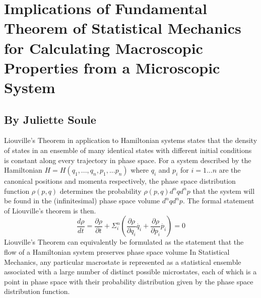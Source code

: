 

\section{Implications of Fundamental Theorem of Statistical Mechanics for Calculating Macroscopic Properties from a Microscopic System}
\subsection*{By Juliette Soule}
Liouville's Theorem in application to Hamiltonian systems states that the density of states in an ensemble of many identical states with different initial conditions is constant along every trajectory in phase space. For a system described by the Hamiltonian $H = H(q_{1},...,q_{n},p_{1},...p_{n})$ where $q_{i}$ and $p_{i}$ for $i=1...n$ are the canonical positions and momenta respectively, the phase space distribution function $\rho(p,q)$ determines the probability $\rho(p,q)d^{n}qd^{n}p$ that the system will be found in the (infinitesimal) phase space volume $d^{n}qd^{n}p$. The formal statement of Liouville's theorem is then.
\begin{equation}
\frac{d\rho}{dt} = \frac{\partial\rho}{\partial t} + \Sigma_{i}^{n}(\frac{\partial\rho}{\partial q_{i}}\dot{q_{i}}+\frac{\partial\rho}{\partial p_{i}}\dot{p_{i}}) = 0
\end{equation}
Liouville's Theorem can equivalently be formulated as the statement that the flow of a Hamiltonian system preserves phase space volume
In Statistical Mechanics, any particular macrostate is represented as a statistical ensemble associated with a large number of distinct possible microstates, each of which is a point in phase space with their probability distribution given by the phase space distribution function. 
